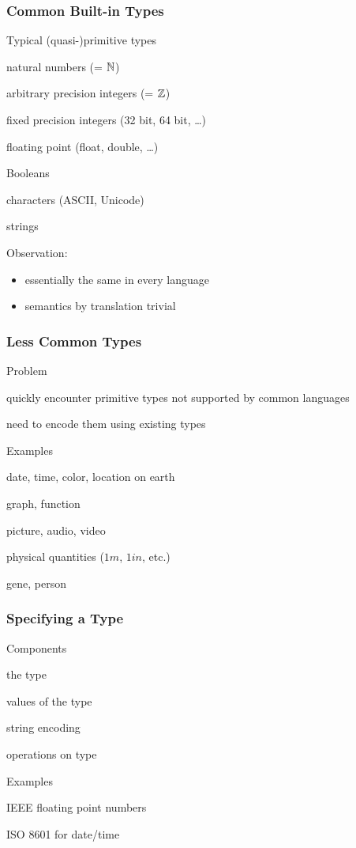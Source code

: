 \begin{frame}\frametitle{Common Built-in Types}
\begin{blockitems}{Typical (quasi-)primitive types}
 \item natural numbers (= $\mathbb{N}$)
 \item arbitrary precision integers (= $\mathbb{Z}$)
 \item fixed precision integers (32 bit, 64 bit, \ldots)
 \item floating point (float, double, \ldots)
 \item Booleans
 \item characters (ASCII, Unicode)
 \item strings
\end{blockitems}

Observation:
\begin{itemize}
\item essentially the same in every language
\item semantics by translation trivial
\end{itemize}
\end{frame}

\begin{frame}\frametitle{Less Common Types}
\begin{blockitems}{Problem}
 \item quickly encounter primitive types not supported by common languages
 \item need to encode them using existing types
\end{blockitems}

\begin{blockitems}{Examples}
\item date, time, color, location on earth
\item graph, function
\item picture, audio, video
\item physical quantities ($1m$, $1in$, etc.)
\item gene, person
\end{blockitems}
\end{frame}

\begin{frame}\frametitle{Specifying a Type}
\begin{blockitems}{Components}
 \item the type 
 \item values of the type 
 \item string encoding 
 \item operations on type 
\end{blockitems}

\begin{blockitems}{Examples}
\item IEEE floating point numbers
\item ISO 8601 for date/time
\end{blockitems}
\end{frame}


